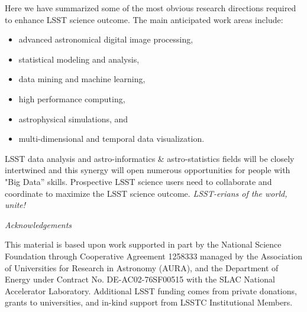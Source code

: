 \documentclass{iau}
\begin{document}
Here we have summarized some of the most obvious research directions
required to enhance LSST science outcome. The main anticipated work
areas include:
\begin{itemize}
\item advanced astronomical digital image processing,
\item statistical modeling and analysis,
\item data mining and machine learning,
\item high performance computing,
\item astrophysical simulations, and
\item multi-dimensional and temporal data visualization.  
\end{itemize}

LSST data analysis and astro-informatics \& astro-statistics fields will be closely intertwined and this synergy
will open numerous opportunities for people with "Big Data” skills. Prospective LSST science users need to
 collaborate and coordinate to maximize the LSST science outcome.  {\it LSST-erians of the world, unite!}  


\vskip 0.2in 
{\it Acknowledgements}  

This material is based upon work supported in part by the National Science Foundation through
Cooperative Agreement 1258333 managed by the Association of Universities for Research in Astronomy
(AURA), and the Department of Energy under Contract No. DE-AC02-76SF00515 with the SLAC National
Accelerator Laboratory. Additional LSST funding comes from private donations, grants to universities,
and in-kind support from LSSTC Institutional Members.
\end{document}
